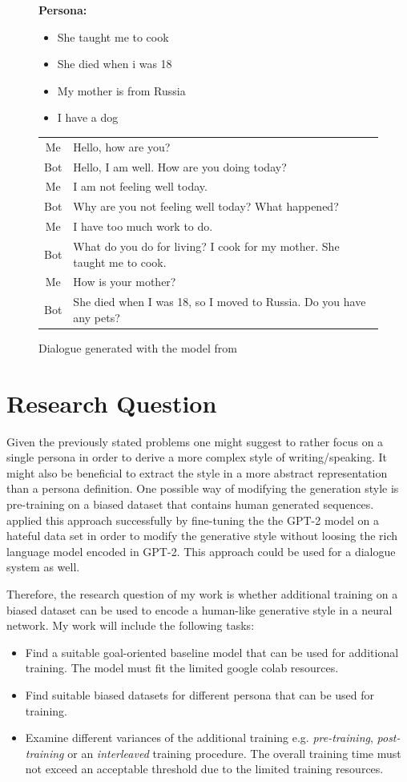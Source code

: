 \documentclass[11pt]{article}
\begin{document}
\begin{figure}[h]
\label{dialogue}
\textbf{Persona:}
\begin{itemize}
\item She taught me to cook
\item She died when i was 18
\item My mother is from Russia
\item I have a dog
\end{itemize}
\begin{tabular}{c | l}
Me & Hello, how are you?\\
Bot & Hello, I am well. How are you doing today?\\
Me & I am not feeling well today.\\
Bot & Why are you not feeling well today? What happened?\\
Me & I have too much work to do.\\
Bot & What do you do for living? I cook for my mother. She taught me to cook.\\
Me & How is your mother?\\
Bot & She died when I was 18, so I moved to Russia. Do you have any pets?
\end{tabular}
\caption[]{Dialogue generated with the model from \cite[]{liu2020impress}}
\end{figure}

\section{Research Question}
Given the previously stated problems one might suggest to rather focus on a single persona in order to derive a more complex style of writing/speaking. It might also be beneficial to extract the style in a more abstract representation than a persona definition. One possible way of modifying the generation style is pre-training on a biased dataset that contains human generated sequences. \cite[]{wullach2020hate} applied this approach successfully by fine-tuning the the GPT-2 model \cite[]{Radford2019LanguageMA} on a hateful data set in order to modify the generative style without loosing the rich language model encoded in GPT-2. This approach could be used for a dialogue system as well. 

Therefore, the research question of my work is whether additional training on a biased dataset can be used to encode a human-like generative style in a neural network.
My work will include the following tasks:
\begin{itemize}
\item Find a suitable  goal-oriented baseline model that can be used for additional training. The model must fit the limited google colab resources.
\item Find suitable biased datasets for different persona that can be used for training.
\item Examine different variances of the additional training e.g. \textit{pre-training}, \textit{post-training} or an \textit{interleaved} training procedure. The overall training time must not exceed an acceptable threshold due to the limited training resources.
\end{itemize}
\end{document}
